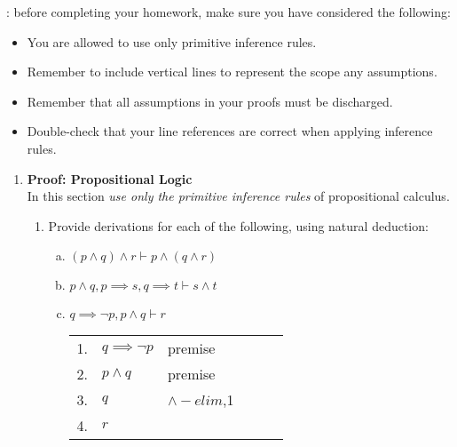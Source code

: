 \documentclass{article}
\begin{document}

: before completing your homework,  make sure you have considered the following:
\begin{itemize}
\item You are allowed to use only primitive inference rules.
\item Remember to include vertical lines to represent the scope any assumptions.
\item Remember that all assumptions in your proofs must be discharged.
\item Double-check that your line references are correct when applying inference rules.
\end{itemize}

\bigskip

\begin{enumerate}[\bf I.]

\item \textbf{Proof: Propositional Logic} \\[6pt]
In this section {\em use only the primitive inference rules} of
propositional calculus.
\begin{enumerate}[1.] \setcounter{enumii}{0}
\item Provide derivations for each of the following, using natural
deduction:
\begin{enumerate}[a.]
 \item $(p \land q)\land r\vdash p \land (q \land r)$ \\
 \item $p \land q,p\implies s,q\implies t\vdash s\land t$ \\
 \item $q \implies \neg p,p\land q\vdash r$ \\
   \begin{tabular}{l ll lll}
     1. & $q \implies \neg p$ & premise \\
     2. & $p\land q$          & premise \\
     3.	& $q$         & $\land-elim$,1\\
     4. & $r$ &  \\
   \end{tabular} \\
   

\end{enumerate}
\end{enumerate}
\end{enumerate}
\end{document}
